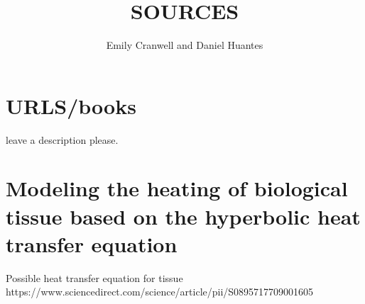 \documentclass[12pt]{article}
\begin{document}
\title{SOURCES}
\author{Emily Cranwell and Daniel Huantes}
\maketitle
\section{URLS/books}
leave a description please.
\section{Modeling the heating of biological tissue based on the hyperbolic heat transfer equation}
Possible heat transfer equation for tissue
https://www.sciencedirect.com/science/article/pii/S0895717709001605
\end{document}
